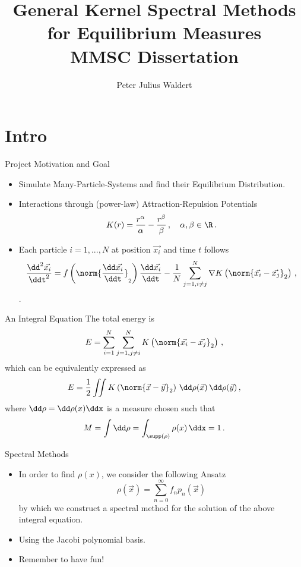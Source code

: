 \documentclass[aspectratio=169,hyperref={colorlinks=true}]{beamer}
\title{General Kernel Spectral Methods for Equilibrium Measures \\ \normalsize MMSC Dissertation}
\author{Peter Julius Waldert}
\institute{Mathematical Institute \\ University of Oxford}
\date{} %
\begin{document}
  {\frame{\titlepage}}

  \section{Intro}
  \begin{frame}{Project Motivation and Goal}
    \begin{itemize}
      \item Simulate Many-Particle-Systems and find their Equilibrium Distribution.
      \item Interactions through (power-law) Attraction-Repulsion Potentials
            $$K(r) = \frac{r^\alpha}{\alpha} - \frac{r^\beta}{\beta}\,,\quad \alpha, \beta \in \R\,.$$
      \item Each particle $i=1, ..., N$ at position $\vec{x_i}$ and time $t$ follows
            $$\frac{\dd^2 \vec{x_i}}{\ddt^2} = f\left(\norm{\frac{\dd \vec{x_i}}{\ddt}}_2\right) \frac{\dd\vec{x_i}}{\ddt} - \frac{1}{N} \sum_{j=1, i\neq j}^{N} \nabla K\left(\norm{\vec{x_i} - \vec{x_j}}_2\right)\,,$$
            \parencite{2020-power-law-kernels, 2021-arbitrary-dimensions}.
    \end{itemize}
  \end{frame}

  \begin{frame}{An Integral Equation}
    The total energy is $$E = \sum_{i=1}^{N} \sum_{j=1, j \neq i}^{N} K\left(\norm{\vec{x_i} - \vec{x_j}}_2\right)\,,$$
    which can be equivalently expressed as
    $$E = \frac{1}{2} \iint K\left(\norm{\vec{x} - \vec{y}}_2\right) \,\dd\rho(\vec{x})\,\dd\rho(\vec{y})\,,$$ where $\dd\rho = \dd\rho(x)\ddx$ is a measure chosen such that $$M = \int \dd\rho = \int_{\supp(\rho)} \rho(x) \,\ddx = 1\,.$$
  \end{frame}

  \begin{frame}{Spectral Methods}
    \begin{itemize}
      \item In order to find $\rho(x)$, we consider the following Ansatz
            $$\rho(\vec{x}) = \sum_{n=0}^{\infty} f_n p_n(\vec{x})$$
            by which we construct a spectral method for the solution of the above integral equation.
      \item Using the Jacobi polynomial basis.
      \item Remember to have fun!
    \end{itemize}
  \end{frame}
\end{document}
